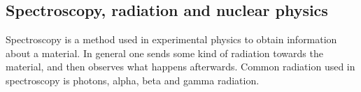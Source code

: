 \subsection*{Spectroscopy, radiation and nuclear physics}








Spectroscopy is a method used in experimental physics to obtain information about a material.
In general one sends some kind of radiation towards the material, and then observes what happens afterwards.
Common radiation used in spectroscopy is photons, alpha, beta and gamma radiation.

